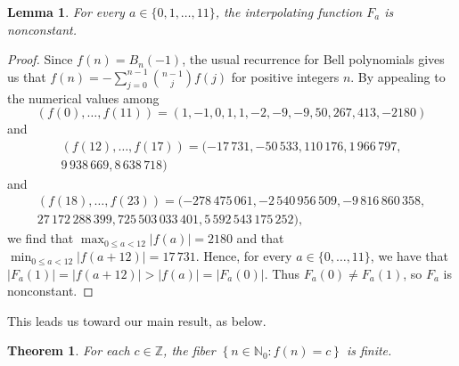 \documentclass[11pt,letterpaper]{amsart}
\newtheorem{theorem}{Theorem}
\newtheorem{lemma}{Lemma}%
\begin{document}
\begin{lemma}\label{lemmainterpolate}
 For every $a \in \{ 0, 1, \ldots, 11 \}$, the interpolating function $F_{a}$ 
 is nonconstant. 
\end{lemma}

\begin{proof}
 Since $f(n) = B_{n}(-1)$, the usual recurrence for Bell polynomials
 gives us that 
 $ f(n) = - \sum_{j=0}^{n-1} \binom{n-1}{j} f(j)$ 
 for positive integers $n$. 
 By appealing to the numerical values among 
 $$ (f(0), \ldots, f(11)) = (1, -1, 0, 1, 1, -2, -9, -9, 50, 267, 413, -2180) $$
 and 
\begin{multline*}
 (f(12), \ldots, f(17))
 = (-17{\,}731, -50{\,}533, 110{\,}176, 1{\,}966{\,}797, \\ 9{\,}938{\,}669, 8{\,}638{\,}718) 
\end{multline*}
 and 
\begin{multline*}
 (f(18), \ldots, f(23))
 = (-278{\,}475{\,}061, -2{\,}540{\,}956{\,}509, -9{\,}816{\,}860{\,}358, \\ 
 27{\,}172{\,}288{\,}399, 725{\,}503{\,}033{\,}401, 5{\,}592{\,}543{\,}175{\,}252), 
\end{multline*}
 we find that 
 $ \max_{0\leq a < 12} |f(a)| = 2180 $
 and that 
 $ \min_{0\leq a < 12} |f(a + 12)| = 17{\,}731$. 
 Hence, for every $a \in \{ 0, \ldots, 11 \}$, we have that 
 $ |F_{a}(1)| = |f(a + 12)| > |f(a)| = |F_{a}(0)|$. 
 Thus $F_{a}(0) \neq F_{a}(1)$, so $F_{a}$ is nonconstant. 
\end{proof}

 This leads us toward our main result, as below. 

\begin{theorem}\label{maintheorem}
 For each $c \in \mathbb{Z}$, the fiber
$ \left\{ n \in \mathbb{N}_{0} : f(n) = c \right\} $ is finite. 
\end{theorem}
\end{document}
